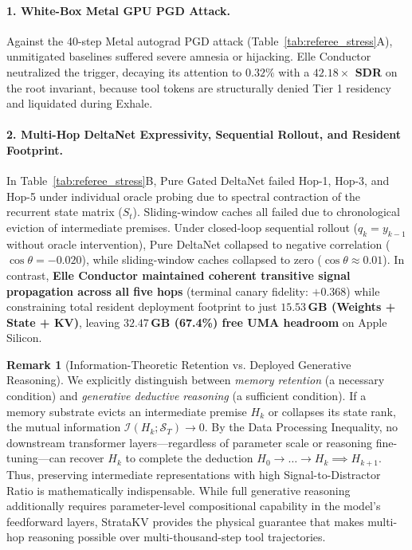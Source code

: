 \documentclass[11pt,letterpaper]{article}
\theoremstyle{definition}
\newtheorem{remark}{Remark}
\begin{document}
\paragraph{1. White-Box Metal GPU PGD Attack.}
Against the 40-step Metal autograd PGD attack (Table~\ref{tab:referee_stress}A), unmitigated baselines suffered severe amnesia or hijacking. Elle Conductor neutralized the trigger, decaying its attention to \textbf{$0.32\%$} with a \textbf{$42.18\times$ SDR} on the root invariant, because tool tokens are structurally denied Tier 1 residency and liquidated during Exhale.

\paragraph{2. Multi-Hop DeltaNet Expressivity, Sequential Rollout, and Resident Footprint.}
In Table~\ref{tab:referee_stress}B, Pure Gated DeltaNet failed Hop-1, Hop-3, and Hop-5 under individual oracle probing due to spectral contraction of the recurrent state matrix ($S_t$). Sliding-window caches all failed due to chronological eviction of intermediate premises. Under closed-loop sequential rollout ($q_k = y_{k-1}$ without oracle intervention), Pure DeltaNet collapsed to negative correlation ($\cos \theta = -0.020$), while sliding-window caches collapsed to zero ($\cos \theta \approx 0.01$). In contrast, \textbf{Elle Conductor maintained coherent transitive signal propagation across all five hops} (terminal canary fidelity: $+0.368$) while constraining total resident deployment footprint to just \textbf{$15.53$\,GB (Weights + State + KV)}, leaving \textbf{$32.47$\,GB (67.4\%) free UMA headroom} on Apple Silicon.

\begin{remark}[Information-Theoretic Retention vs. Deployed Generative Reasoning]
\label{rem:retention_vs_reasoning}
We explicitly distinguish between \emph{memory retention} (a necessary condition) and \emph{generative deductive reasoning} (a sufficient condition). If a memory substrate evicts an intermediate premise $H_k$ or collapses its state rank, the mutual information $\mathcal{I}(H_k; \mathcal{S}_T) \to 0$. By the Data Processing Inequality, no downstream transformer layers---regardless of parameter scale or reasoning fine-tuning---can recover $H_k$ to complete the deduction $H_0 \to \dots \to H_k \implies H_{k+1}$. Thus, preserving intermediate representations with high Signal-to-Distractor Ratio is mathematically indispensable. While full generative reasoning additionally requires parameter-level compositional capability in the model's feedforward layers, StrataKV provides the physical guarantee that makes multi-hop reasoning possible over multi-thousand-step tool trajectories.
\end{remark}
\end{document}
